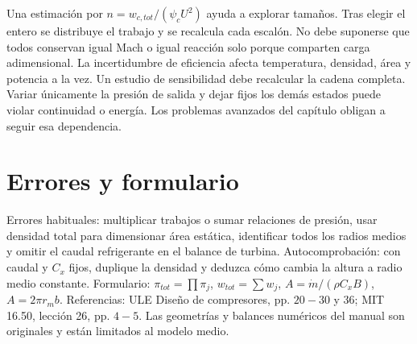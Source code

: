 \documentclass[10pt,openany]{book}
\begin{document}
Una estimación por \(n=w_{c,tot}/(\psi_cU^2)\) ayuda a explorar tamaños. Tras elegir el entero se distribuye el trabajo y se recalcula cada escalón. No debe suponerse que todos conservan igual Mach o igual reacción solo porque comparten carga adimensional.
La incertidumbre de eficiencia afecta temperatura, densidad, área y potencia a la vez. Un estudio de sensibilidad debe recalcular la cadena completa. Variar únicamente la presión de salida y dejar fijos los demás estados puede violar continuidad o energía. Los problemas avanzados del capítulo obligan a seguir esa dependencia.

\section{Errores y formulario}

Errores habituales: multiplicar trabajos o sumar relaciones de presión, usar densidad total para dimensionar área estática, identificar todos los radios medios y omitir el caudal refrigerante en el balance de turbina. Autocomprobación: con caudal y \(C_x\) fijos, duplique la densidad y deduzca cómo cambia la altura a radio medio constante.
Formulario: \(\pi_{tot}=\prod\pi_j\), \(w_{tot}=\sum w_j\), \(A=\dot m/(\rho C_xB)\), \(A=2\pi r_mb\). Referencias: ULE Diseño de compresores, pp. \(20-30\) y 36; MIT 16.50, lección 26, pp. \(4-5\). Las geometrías y balances numéricos del manual son originales y están limitados al modelo medio.
\end{document}
